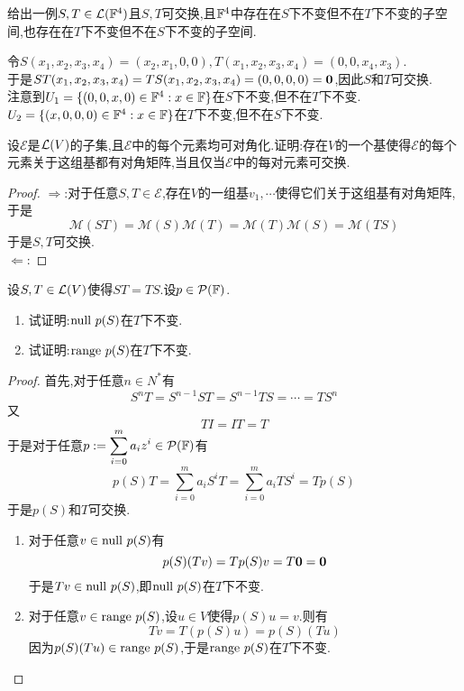 \documentclass{ctexart}
\begin{document}
\pagestyle{empty}
\begin{center}
    \large{}
\end{center}
\begin{problem}[1.]
    给出一例$S,T\in\mathcal{L}(\mathbb{F}^4)$且$S,T$可交换,且$\mathbb{F}^4$中存在在$S$下不变但不在$T$下不变的子空间,也存在在$T$下不变但不在$S$下不变的子空间.
\end{problem}
\begin{solution}
    令$S(x_1,x_2,x_3,x_4)=(x_2,x_1,0,0),T(x_1,x_2,x_3,x_4)=(0,0,x_4,x_3)$.\\
    于是$ST(x_1,x_2,x_3,x_4)=TS(x_1,x_2,x_3,x_4)=(0,0,0,0)=\mathbf0$,因此$S$和$T$可交换.\\
    注意到$U_1=\{(0,0,x,0)\in\mathbb{F}^4:x\in\mathbb{F}\}$在$S$下不变,但不在$T$下不变.\\
    $U_2=\{(x,0,0,0)\in\mathbb{F}^4:x\in\mathbb{F}\}$在$T$下不变,但不在$S$下不变.
\end{solution}
\begin{problem}[2.]
    设$\mathcal{E}$是$\mathcal{L}(V)$的子集,且$\mathcal{E}$中的每个元素均可对角化.证明:存在$V$的一个基使得$\mathcal{E}$的每个元素关于这组基都有对角矩阵,当且仅当$\mathcal{E}$中的每对元素可交换.
\end{problem}
\begin{proof}
    $\Rightarrow$:对于任意$S,T\in\mathcal{E}$,存在$V$的一组基$v_1,\cdots$使得它们关于这组基有对角矩阵,于是
    \[\mathcal{M}(ST)=\mathcal{M}(S)\mathcal{M}(T)=\mathcal{M}(T)\mathcal{M}(S)=\mathcal{M}(TS)\]
    于是$S,T$可交换.\\
    $\Leftarrow$:

\end{proof}
\begin{problem}[3.]
    设$S,T\in\mathcal{L}(V)$使得$ST=TS$.设$p\in\mathcal{P}(\mathbb{F})$.
    \begin{enumerate}[label=\tbf{(\arabic*)}]
        \item 试证明:$\text{null } p(S)$在$T$下不变.
        \item 试证明:$\text{range } p(S)$在$T$下不变.
    \end{enumerate}
\end{problem}
\begin{proof}
    首先,对于任意$n\in N^*$有
        \[S^{n}T=S^{n-1}ST=S^{n-1}TS=\cdots=TS^n\]
    又
    \[TI=IT=T\]
    于是对于任意$\displaystyle p:=\sum_{i=0}^{m}a_iz^i\in\mathcal{P}(\mathbb{F})$有
    \[p(S)T=\sum_{i=0}^{m}a_iS^iT=\sum_{i=0}^{m}a_iTS^i=Tp(S)\]
    于是$p(S)$和$T$可交换.
    \begin{enumerate}[label=\tbf{(\arabic*)}]
        \item 对于任意$v\in\text{null } p(S)$有
            \[p(S)(Tv)=Tp(S)v=T\mathbf0=\mathbf0\]
            于是$Tv\in\text{null } p(S)$,即$\text{null } p(S)$在$T$下不变.
        \item 对于任意$v\in\text{range } p(S)$,设$u\in V$使得$p(S)u=v$.则有
            \[Tv=T(p(S)u)=p(S)(Tu)\]
            因为$p(S)(Tu)\in\text{range } p(S)$,于是$\text{range } p(S)$在$T$下不变.
    \end{enumerate}
\end{proof}
\end{document}
